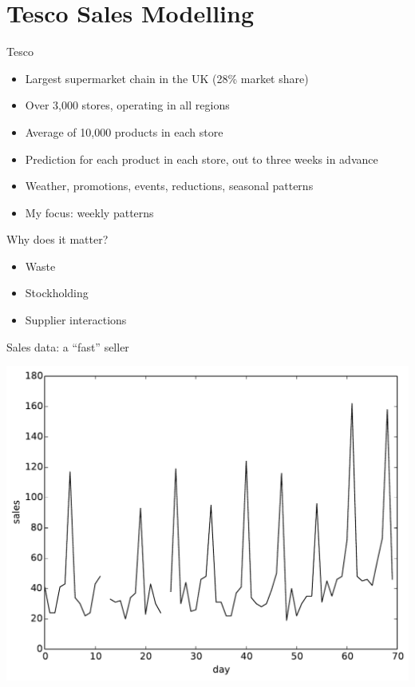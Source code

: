 \documentclass{beamer}
\begin{document}
\section{Tesco Sales Modelling}

\begin{frame}{Tesco}
 \begin{itemize}
  \item Largest supermarket chain in the UK (28\% market share)
  \item Over 3,000 stores, operating in all regions
  \item Average of 10,000 products in each store
  \item Prediction for each product in each store, out to three weeks in advance
  \item Weather, promotions, events, reductions, seasonal patterns
  \item My focus: weekly patterns
 \end{itemize}
\end{frame}

\begin{frame}{Why does it matter?}
 \begin{itemize}
  \item Waste
  \item Stockholding
  \item Supplier interactions
 \end{itemize}
\end{frame}

\begin{frame}{Sales data: a ``fast'' seller}
 \begin{center}
  \includegraphics[width=0.8\columnwidth]{fast_seller.pdf}
 \end{center}
\end{frame}
\end{document}
